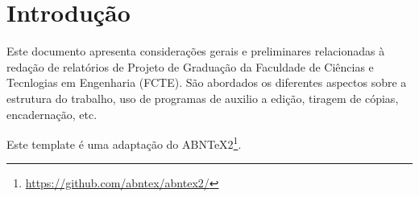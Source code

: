 \chapter*[Introdução]{Introdução}

Este documento apresenta considerações gerais e preliminares relacionadas 
à redação de relatórios de Projeto de Graduação da Faculdade de Ciências e Tecnlogias em Engenharia (FCTE). São abordados os diferentes aspectos sobre a estrutura do trabalho, uso de programas de auxilio a edição, tiragem de cópias, encadernação, etc.

Este template é uma adaptação do ABNTeX2\footnote{\url{https://github.com/abntex/abntex2/}}.
